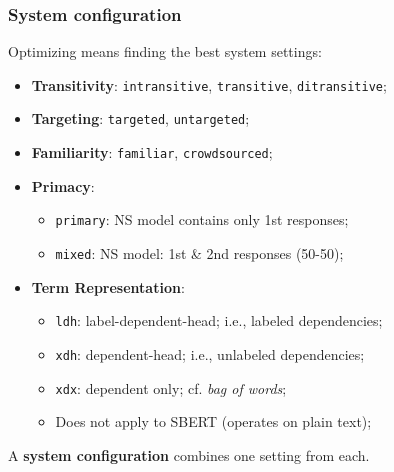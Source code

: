 \documentclass[xcolor={dvipsnames}]{beamer}
\newcommand{\param}[1]{\texttt{#1}}
\begin{document}
\begin{frame}
\frametitle{System configuration}
\small

\vspace{.8em}
Optimizing means finding the best system settings:

\begin{itemize}
\pause
\item \textbf{Transitivity}: \param{intransitive}, \param{transitive}, \param{ditransitive};
\pause
\item \textbf{Targeting}: \param{targeted}, \param{untargeted};
\pause
\item \textbf{Familiarity}: \param{familiar}, \param{crowdsourced};
\pause
\item \textbf{Primacy}:
\begin{itemize}
\item \param{primary}: NS model contains only 1st responses;
\item \param{mixed}: NS model: 1st \& 2nd responses (50-50);
\end{itemize}
\pause
\item \textbf{Term Representation}:
\begin{itemize}
\item \param{ldh}: label-dependent-head; i.e., labeled dependencies;
\item \param{xdh}: dependent-head; i.e., unlabeled dependencies;
\item \param{xdx}: dependent only; cf. \textit{bag of words};
\item Does not apply to SBERT (operates on plain text);
\end{itemize}
\end{itemize}

\vspace{.3em}
\pause
A \textbf{system configuration} combines one setting from each.

\end{frame}




%
%
\end{document}
